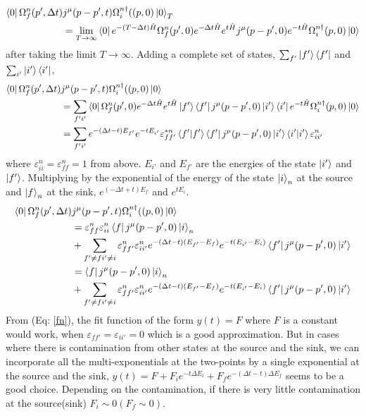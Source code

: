 \documentclass[10pt]{article}
\begin{document}
\begin{align*}
\bra{0}\Omega^{n}_{f}(p',\Delta t)&j^{\mu}(p - p',t)\Omega^{n\dagger}_{i}((p,0) \ket{0}_T \\
&= \lim_{T \to \infty} \bra{0}e^{-(T- \Delta t)\hat{H}} \Omega^{n}_{f}(p',0)e^{- \Delta t \hat{H}} e^{ t \hat{H}} j^{\mu}(p - p',0) e^{ - t \hat{H}} \Omega^{n\dagger}_{i}(p,0) \ket{0}
\end{align*}
after taking the limit $T \to \infty$. Adding a complete set of states, $\sum_{f'} \ket{f'}\bra{f'}$ and $\sum_{i'} \ket{i'}\bra{i'}$,
\begin{align*}
\bra{0}\Omega^{n}_{f}(p',\Delta t)&j^{\mu}(p - p',t)\Omega^{n\dagger}_{i}((p,0) \ket{0} \\
&= \sum_{f' i'} \bra{0}\Omega^{n}_{f}(p',0)e^{- \Delta t \hat{H}} e^{ t \hat{H}} \ket{f'}\bra{f'} j^{\mu}(p - p',0)  \ket{i'}\bra{i'}e^{ - t \hat{H}} \Omega^{n\dagger}_{i}(p,0) \ket{0} \\
&=\sum_{f' i'} e^{-( \Delta t - t) E_{f'} }  e^{ - t E_{i'}} \varepsilon^{*n}_{ff'}  \bra{f'}\ket{f'}\bra{f'} j^{\mu}(p - p',0) \ket{i'}\bra{i'}\ket{i'}  \varepsilon^{n}_{ii'}
\end{align*}
where $ \varepsilon^{n}_{ii} = \varepsilon^{n}_{ff} = 1$ from above. $E_{i'}$ and $E_{f'}$ are the energies of the state $\ket{i'}$ and $\ket{f'}$. Multiplying by the exponential of the energy of the state $\ket{i}_n$ at the source and $\ket{f}_n$ at the sink, $e^{( -\Delta t + t) E_{f} }$ and $e^{  t E_{i}}$.
\begin{align}
\begin{split}
\label{fn}
\bra{0}\Omega^{n}_{f}(p',\Delta t)&j^{\mu}(p - p',t)\Omega^{n\dagger}_{i}((p,0) \ket{0} \\
&=\varepsilon^{n}_{ff}  \varepsilon^{n}_{ii} \bra{f} j^{\mu}(p - p',0) \ket{i}_n \\
&+\sum_{f' \ne f i' \ne i}  \varepsilon^{n}_{ff'}  \varepsilon^{n}_{ii'} e^{-( \Delta t - t) (E_{f'} -  E_{f}) }  e^{ - t (E_{i'} -E_{i})}  \bra{f'} j^{\mu}(p - p',0) \ket{i'}\\
&=\bra{f} j^{\mu}(p - p',0) \ket{i}_n \\
&+\sum_{f' \ne f i' \ne i}  \varepsilon^{n}_{ff'}  \varepsilon^{n}_{ii'} e^{-( \Delta t - t) (E_{f'} -  E_{f}) }  e^{ - t (E_{i'} -E_{i})}  \bra{f'} j^{\mu}(p - p',0) \ket{i'}
\end{split}
\end{align}
From (Eq: \ref{fn}), the fit function of the form $y(t) = F$ where $F$ is a constant would work, when $\varepsilon_{ff'}  = \varepsilon_{ii'}  = 0$ which is a good approximation. But in cases where there is contamination from other states at the source and the sink, we can incorporate all the multi-exponentials at the two-points by a single exponential at the source and the sink, $y(t) = F + F_i e^{-t \Delta E_i} + F_f e^{-(\Delta t - t ) \Delta E_f}$ seems to be a good choice. Depending on the contamination, if there is very little contamination at the source(sink) $F_i \sim 0(F_f \sim 0)$. \par
\end{document}
